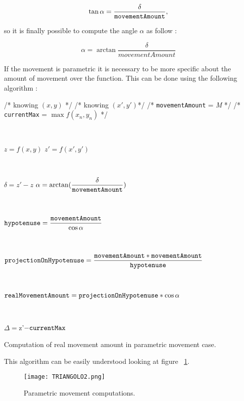 \begin{equation}
	\tan \alpha = \dfrac{\delta}{\tt movementAmount},
\end{equation}

so it is finally possible to compute the angle $\alpha$ as follow :

\begin{equation}
	\alpha = \arctan \dfrac{\delta}{movementAmount}
\end{equation}

If the movement is parametric it is necessary to be more specific about the amount of movement over the function. This can be done using the following algorithm :

\begin{algorithm}
	/* knowing $(x, y)$ */ \;
	/* knowing $(x', y')$*/ \;
	/* {\tt movementAmount} = \textit{M} */ \;
	/* {\tt currentMax} = $\max f(x_n, y_n)$ */ \;
	
	
	\
	
	$z = f(x, y)$ \;
	$z' = f(x', y')$\;
	
	\
	
	$\delta = z' - z$ \;
	$\alpha = \arctan(\dfrac{\delta}{\tt movementAmount})$ \;
	
	\
	
	${\tt hypotenuse} = \dfrac{{\tt movementAmount}}{\cos \alpha}$ \;
	
	\
	
	${\tt projectionOnHypotenuse} = \dfrac{{\tt movementAmount} * {\tt movementAmount}}{{\tt hypotenuse}}$ \;
	
	\
	
	${\tt realMovementAmount} = {\tt projectionOnHypotenuse} * \cos \alpha$ \;
	 
	 \
	
	$\Delta = $z'$ - {\tt currentMax} $\;
	
	\caption{Computation of real movement amount in parametric movement case.} 
	\label{PMAlgo}
	
\end{algorithm}

This algorithm can be easily understood looking at figure ~\ref{fig:PMComputations}. 

\begin{figure} [h!]
	\centering
	\texttt{[image: TRIANGOLO2.png]}
	\caption{Parametric movement computations.}
	\label{fig:PMComputations}
\end{figure}

